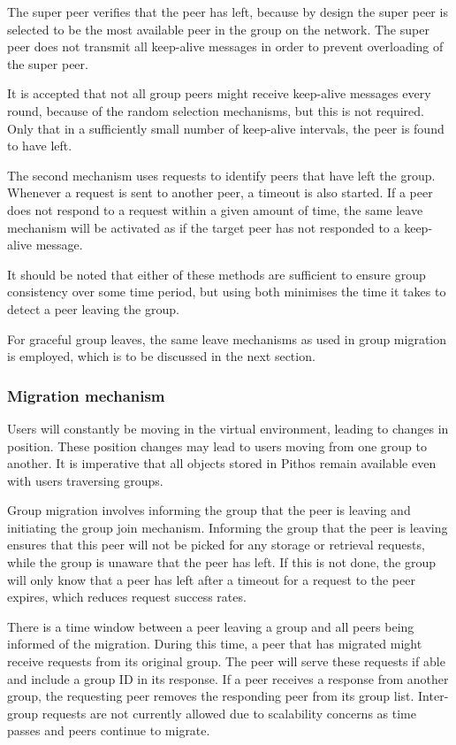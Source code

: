 The super peer verifies that the peer has left, because by design the super peer is selected to be the most available peer in the group on the network. The super peer does not transmit all keep-alive messages in order to prevent overloading of the super peer.

It is accepted that not all group peers might receive keep-alive messages every round, because of the random selection mechanisms, but this is not required. Only that in a sufficiently small number of keep-alive intervals, the peer is found to have left.

The second mechanism uses requests to identify peers that have left the group. Whenever a request is sent to another peer, a timeout is also started. If a peer does not respond to a request within a given amount of time, the same leave mechanism will be activated as if the target peer has not responded to a keep-alive message.

It should be noted that either of these methods are sufficient to ensure group consistency over some time period, but using both minimises the time it takes to detect a peer leaving the group.

For graceful group leaves, the same leave mechanisms as used in group migration is employed, which is to be discussed in the next section.

\subsubsection{Migration mechanism}
\label{migration_design}

Users will constantly be moving in the virtual environment, leading to changes in position. These position changes may lead to users moving from one group to another. It is imperative that all objects stored in Pithos remain available even with users traversing groups.

Group migration involves informing the group that the peer is leaving and initiating the group join mechanism. Informing the group that the peer is leaving ensures that this peer will not be picked for any storage or retrieval requests, while the group is unaware that the peer has left. If this is not done, the group will only know that a peer has left after a timeout for a request to the peer expires, which reduces request success rates.

There is a time window between a peer leaving a group and all peers being informed of the migration. During this time, a peer that has migrated might receive requests from its original group. The peer will serve these requests if able and include a group ID in its response. If a peer receives a response from another group, the requesting peer removes the responding peer from its group list. Inter-group requests are not currently allowed due to scalability concerns as time passes and peers continue to migrate.


